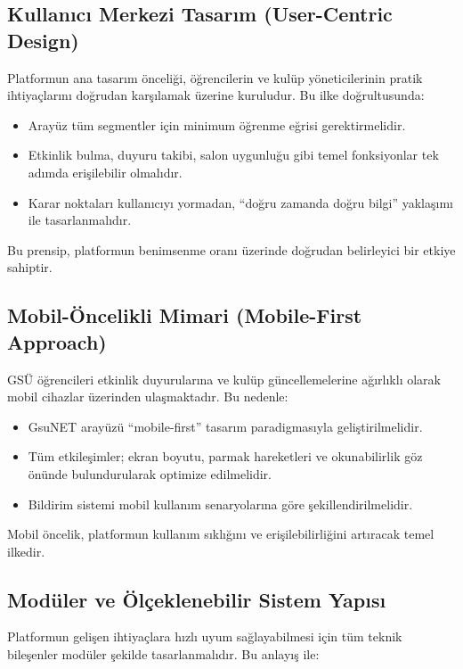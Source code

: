 \documentclass[a4paper,12pt]{report}
\begin{document}
\subsection{Kullanıcı Merkezi Tasarım (User-Centric Design)}

Platformun ana tasarım önceliği, öğrencilerin ve kulüp yöneticilerinin pratik ihtiyaçlarını doğrudan karşılamak üzerine kuruludur. Bu ilke doğrultusunda:

\begin{itemize}
    \item Arayüz tüm segmentler için minimum öğrenme eğrisi gerektirmelidir.
    \item Etkinlik bulma, duyuru takibi, salon uygunluğu gibi temel fonksiyonlar tek adımda erişilebilir olmalıdır.
    \item Karar noktaları kullanıcıyı yormadan, “doğru zamanda doğru bilgi” yaklaşımı ile tasarlanmalıdır.
\end{itemize}

Bu prensip, platformun benimsenme oranı üzerinde doğrudan belirleyici bir etkiye sahiptir.

\subsection{Mobil-Öncelikli Mimari (Mobile-First Approach)}

GSÜ öğrencileri etkinlik duyurularına ve kulüp güncellemelerine ağırlıklı olarak mobil cihazlar üzerinden ulaşmaktadır. Bu nedenle:

\begin{itemize}
    \item GsuNET arayüzü “mobile-first” tasarım paradigmasıyla geliştirilmelidir.
    \item Tüm etkileşimler; ekran boyutu, parmak hareketleri ve okunabilirlik göz önünde bulundurularak optimize edilmelidir.
    \item Bildirim sistemi mobil kullanım senaryolarına göre şekillendirilmelidir.
\end{itemize}

Mobil öncelik, platformun kullanım sıklığını ve erişilebilirliğini artıracak temel ilkedir.

\subsection{Modüler ve Ölçeklenebilir Sistem Yapısı}

Platformun gelişen ihtiyaçlara hızlı uyum sağlayabilmesi için tüm teknik bileşenler modüler şekilde tasarlanmalıdır. Bu anlayış ile:
\end{document}

